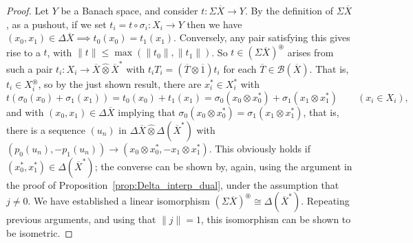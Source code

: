 \documentclass[a4paper,11pt]{article}
\theoremstyle{plain}
\theoremstyle{remark}
\newcommand{\mc}[1]{\mathcal{#1}}
\newcommand{\proten}{\widehat\otimes}
\newcommand{\intdual}{\circledast}
\begin{document}
\begin{proof}
Let $Y$ be a Banach space, and consider $t\colon \Sigma\overline X \to Y$.  By the definition of $\Sigma\overline X$, as a pushout, if we set $t_i = t\circ\sigma_i \colon X_i \to Y$ then we have $(x_0,x_1)\in\Delta\overline X \implies t_0(x_0) = t_1(x_1)$.  Conversely, any pair satisfying this gives rise to a $t$, with $\|t\| \leq \max(\|t_0\|, \|t_1\|)$.  So $t\in (\Sigma\overline X)^\intdual$ arises from such a pair $t_i \colon X_i \to \overline X \proten \overline X^*$ with $t_i T_i = (\overline T\otimes\overline 1)t_i$ for each $\overline T\in\mc B(\overline X)$.  That is, $t_i \in X_i^\intdual$, so by the just shown result, there are $x_i^*\in X_i^*$ with
\[ t(\sigma_0(x_0) + \sigma_1(x_1)) = t_0(x_0) + t_1(x_1)
= \sigma_0(x_0\otimes x_0^*) + \sigma_1(x_1\otimes x_1^*)
\qquad (x_i\in X_i), \]
and with $(x_0,x_1) \in \Delta\overline X$ implying that $\sigma_0(x_0\otimes x_0^*) = \sigma_1(x_1\otimes x_1^*)$, that is, there is a sequence $(u_n)$ in $\Delta\overline X \proten \Delta(\overline X^*)$ with $(p_0(u_n), -p_1(u_n)) \to (x_0\otimes x_0^*, -x_1\otimes x_1^*)$.  This obviously holds if $(x_0^*, x_1^*) \in \Delta(\overline X^*)$; the converse can be shown by, again, using the argument in the proof of Proposition~\ref{prop:Delta_interp_dual}, under the assumption that $j\not=0$.  We have established a linear isomorphism $(\Sigma\overline X)^\intdual \cong \Delta(\overline X^*)$.  Repeating previous arguments, and using that $\|j\|=1$, this isomorphism can be shown to be isometric.
\end{proof}







\end{document}
